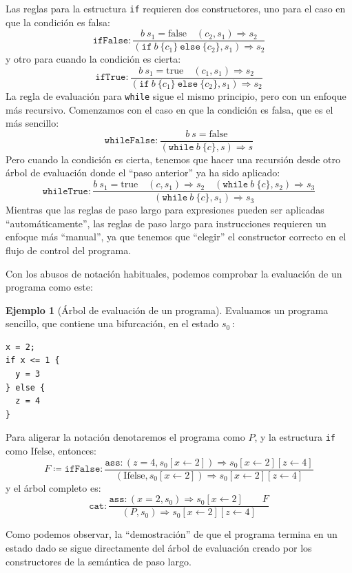 \documentclass[
  a4paper, 
  10pt, 
  parskip=half, 
  toc=bibliography,
]{scrbook}
\theoremstyle{definition}
\theoremstyle{bolddef}
\newtheorem{example}[theorem]{Ejemplo}
\newcommand{\funfont}[1]{\texttt{#1}}
\newcommand{\ImpIfElse}[3]{\texttt{if} \ {#1} \ \{{#2}\} \ \texttt{else} \ \{{#3}\}}
\newcommand{\ImpWhile}[2]{\texttt{while} \ {#1} \ \{{#2}\}}
\newcommand{\ImpAssign}[2]{{#1} = {#2}}
\newcommand{\LeanTrue}{\text{true}}
\newcommand{\LeanFalse}{\text{false}}
\newcommand{\bigstep}{\Longrightarrow}
\begin{document}
Las reglas para la estructura \texttt{if} requieren dos constructores,
uno para el caso en que la condición es falsa:
\[
\funfont{ifFalse} : \frac{b \ s_1 = \LeanFalse \quad (c_2, s_1) \bigstep s_2}
{(\ImpIfElse{b}{c_1}{c_2}, s_1) \bigstep s_2}
\]
y otro para cuando la condición es cierta:
\[
\funfont{ifTrue} : \frac{b \ s_1 = \LeanTrue \quad (c_1, s_1) \bigstep s_2}
{(\ImpIfElse{b}{c_1}{c_2}, s_1) \bigstep s_2}
\]
La regla de evaluación para \texttt{while} sigue el mismo principio, pero con un enfoque más
recursivo. Comenzamos con el caso en que la condición es falsa, que es el más sencillo:
\[
\funfont{whileFalse} : \frac{b \ s = \LeanFalse}
  {(\ImpWhile{b}{c}, s) \bigstep s}
\]
Pero cuando la condición es cierta, tenemos que hacer una recursión desde otro árbol de evaluación
donde el \enquote{paso anterior} ya ha sido aplicado:
\[
\funfont{whileTrue} : \frac{b \ s_1 = \LeanTrue \quad (c, s_1) \bigstep s_2 \quad
  (\ImpWhile{b}{c}, s_2) \bigstep s_3}
{(\ImpWhile{b}{c}, s_1) \bigstep s_3}
\]
Mientras que las reglas de paso largo para expresiones pueden ser aplicadas
\enquote{automáticamente}, las reglas de paso largo para instrucciones requieren un enfoque
más \enquote{manual}, ya que tenemos que \enquote{elegir} el constructor correcto
en el flujo de control del programa.

Con los abusos de notación habituales, podemos comprobar la evaluación de un
programa como este:
\begin{example}[Árbol de evaluación de un programa]
  Evaluamos un programa sencillo, que contiene una bifurcación, en el estado \(s_0\, \):
\begin{verbatim}
x = 2;
if x <= 1 {
  y = 3
} else {
  z = 4
}
\end{verbatim}
  Para aligerar la notación denotaremos el programa como \(P\), y la estructura 
  \texttt{if} como \(\text{Ifelse}\), entonces:
  \[
    F \coloneqq \funfont{ifFalse}: \displaystyle{\frac{
      \funfont{ass}: (\ImpAssign{z}{4} , s_0[x \leftarrow 2]) \bigstep s_0[x \leftarrow 2][z \leftarrow 4]
      }
    {
      (\text{Ifelse}, s_0[x \leftarrow 2]) \bigstep s_0[x \leftarrow 2][z \leftarrow 4]
    }}
  \]
  y el árbol completo es:
  \[
  \funfont{cat}: \frac{
    \funfont{ass}: (\ImpAssign{x}{2}, s_0) \bigstep s_0[x \leftarrow 2]
    \qquad
    F
  }{
    (P, s_0) \bigstep s_0[x \leftarrow 2][z \leftarrow 4]
  }
  \]
\end{example}
Como podemos observar, la \enquote{demostración} de que el programa termina
en un estado dado se sigue directamente del árbol de evaluación creado por los
constructores de la semántica de paso largo.
\end{document}
